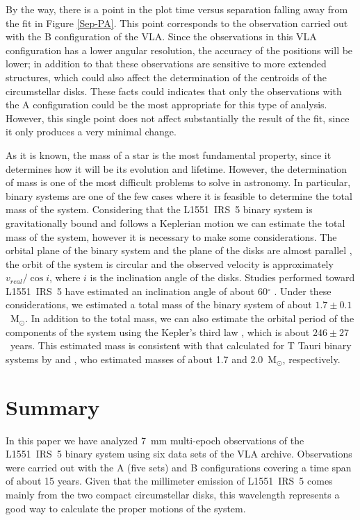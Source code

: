 \documentclass[debug]{rmaa}
\begin{document}
By the way, there is a point in the plot time versus separation falling away
from the fit in Figure \ref{Sep-PA}. This point corresponds to the observation 
carried out with the B configuration of the VLA. Since the observations in this 
VLA configuration has a lower angular resolution, the accuracy of the positions
will be lower; in addition to that these observations are sensitive to more 
extended structures, which could also affect the determination of the centroids
of the circumstellar disks.
These facts could indicates that only the 
observations with the A configuration could be the most appropriate for this type
of analysis. However, this single point does not affect substantially the result 
of the fit, since it only produces a very minimal change.


As it is known, the mass of a star is the most fundamental property, since it determines
how it will be its evolution and lifetime. However,
the determination of mass is one of the most difficult problems to solve in astronomy.
In particular, binary systems are one of the few cases where it is feasible to determine
the total mass of the system. Considering that the L1551~IRS~5 binary system is 
gravitationally bound and follows a Keplerian motion we can  estimate the 
total mass of the system, however it is necessary to make some considerations.
The orbital plane of the binary system and the plane of the disks are almost 
parallel \citep[see][]{Bate2000}, the orbit of the system is circular and the 
observed velocity is approximately $v_{real}/\cos i$, where $i$ is the inclination 
angle of the disks. Studies performed toward L1551~IRS~5 have estimated an
inclination angle of about 60$^{\circ}$ \citep[e.g.][]{Rodriguez1998, Chou2014}.
Under these considerations, we estimated a total mass of the binary system of
about $1.7\pm0.1$~M$_{\odot}$.
In addition to the total mass, we can also estimate the orbital
period of the components of the system using the Kepler's third law
, which is about $246\pm27$~years.
This estimated mass is consistent with that calculated for T Tauri binary systems
by \citet{Ghez1995} and \citet{Woitas2001}, who estimated masses
of about 1.7 and 2.0~M$_{\odot}$, respectively.

                    
\section{Summary}
\label{summary}

In this paper we have analyzed 7~mm multi-epoch observations of the L1551~IRS~5 
binary system  using six data sets of the VLA archive. Observations were carried
out with the A (five sets) and B configurations covering a time span of about 15 years.
Given that the millimeter emission of L1551~IRS~5 comes mainly from the two compact
circumstellar disks, this wavelength represents a good way to calculate the proper
motions of the system.
\end{document}
